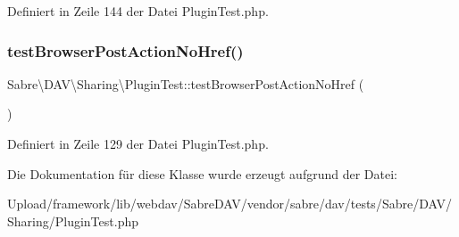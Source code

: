 Definiert in Zeile 144 der Datei Plugin\+Test.\+php.

\mbox{\label{class_sabre_1_1_d_a_v_1_1_sharing_1_1_plugin_test_a508ace1a26577d907ced259eb6f4a227}} 
\subsubsection{\texorpdfstring{test\+Browser\+Post\+Action\+No\+Href()}{testBrowserPostActionNoHref()}}
{\footnotesize\ttfamily Sabre\textbackslash{}\+D\+A\+V\textbackslash{}\+Sharing\textbackslash{}\+Plugin\+Test\+::test\+Browser\+Post\+Action\+No\+Href (\begin{DoxyParamCaption}{ }\end{DoxyParamCaption})}



Definiert in Zeile 129 der Datei Plugin\+Test.\+php.



Die Dokumentation für diese Klasse wurde erzeugt aufgrund der Datei\+:\begin{DoxyCompactItemize}
\item 
Upload/framework/lib/webdav/\+Sabre\+D\+A\+V/vendor/sabre/dav/tests/\+Sabre/\+D\+A\+V/\+Sharing/Plugin\+Test.\+php\end{DoxyCompactItemize}
